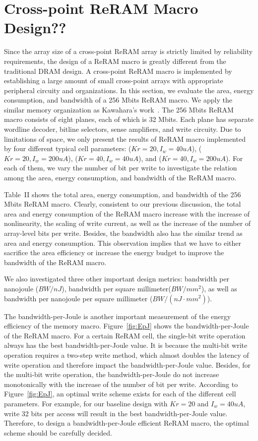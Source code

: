 \vspace{-5pt}
\section{Cross-point ReRAM Macro Design??}\label{sec:macro}
Since the array size of a cross-point ReRAM array is strictly limited by
reliability requirements, the design of a ReRAM macro is greatly different
from the traditional DRAM design. A cross-point ReRAM macro is implemented
by establishing a large amount of small cross-point arrays with
appropriate peripheral circuity and organizations. In this section, we
evaluate the area, energy consumption, and bandwidth of a 256 Mbits ReRAM
macro. We apply the similar memory organization as Kawahara's
work~\cite{crossbar_Panasonic}. The 256 Mbits ReRAM macro consists of
eight planes, each of which is 32 Mbits. Each plane has separate wordline
decoder, bitline selectors, sense amplifiers, and write circuity. Due to
limitations of space, we only present the results of ReRAM macro
implemented by four different typical cell parameters: ($Kr=20,
I_w=40uA$), ($Kr=20, I_w=200uA$), ($Kr=40, I_w=40uA$), and ($Kr=40,
I_w=200uA$). For each of them, we vary the number of bit per write to
investigate the relation among the area, energy consumption, and bandwidth
of the ReRAM macro.


Table~II shows the total area, energy consumption, and bandwidth of the
256 Mbits ReRAM macro. Clearly, consistent to our previous discussion, the
total area and energy consumption of the ReRAM macro increase with the
increase of nonlinearity, the scaling of write current, as well as the
increase of the number of array-level bits per write. Besides, the
bandwidth also has the similar trend as area and energy consumption. This
observation implies that we have to either sacrifice the area efficiency
or increase the energy budget to improve the bandwidth of the ReRAM macro.

We also investigated three other important design metrics: bandwidth per
nanojoule ($BW/nJ$), bandwidth per square millimeter($BW/mm^2$), as well
as bandwidth per nanojoule per square millimeter ($BW/(nJ\cdot mm^2)$).

 The bandwidth-per-Joule is another important
measurement of the energy efficiency of the memory macro.
Figure~\ref{fig:EpJ} shows the bandwidth-per-Joule of the ReRAM macro. For
a certain ReRAM cell, the single-bit write operation always has the best
bandwidth-per-Joule value. It is because the multi-bit write operation
requires a two-step write method, which almost doubles the latency of
write operation and therefore impact the bandwidth-per-Joule value.
Besides, for the multi-bit write operation, the bandwidth-per-Joule do not
increase monotonically with the increase of the number of bit per write.
According to Figure~\ref{fig:EpJ}, an optimal write scheme exists for each
of the different cell parameters. For example, for our baseline design
with $Kr=20$ and $I_w=40uA$, write 32 bits per access will result in the
best bandwidth-per-Joule value. Therefore, to design a bandwidth-per-Joule
efficient ReRAM macro, the optimal scheme should be carefully decided.


